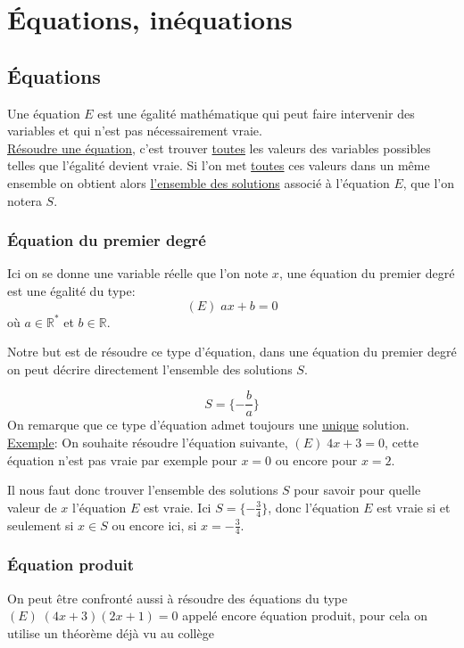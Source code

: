 \documentclass[french]{book}
\begin{document}
\section{Équations, inéquations}
\subsection{Équations}
\begin{defn}
Une équation $E$ est une égalité mathématique qui peut faire intervenir des variables et qui n'est pas nécessairement vraie. \\

\underline{Résoudre une équation}, c'est trouver \underline{toutes} les valeurs des variables possibles telles que l'égalité devient vraie. Si l'on met \underline{toutes} ces valeurs dans un même ensemble on obtient alors \underline{l'ensemble des solutions} associé à l'équation $E$, que l'on notera $S$. 
\end{defn}

\subsubsection{Équation du premier degré}
Ici on se donne une variable réelle que l'on note $x$, une équation du premier degré est une égalité du type: 
$$(E) \; ax+b=0 $$ 
où $a\in \mathbb{R}^{*}$ et $b\in \mathbb{R}$.

Notre but est de résoudre ce type d'équation, dans une équation du premier degré on peut décrire directement l'ensemble des solutions $S$.

$$S=\{ - \frac{b}{a}\}$$
On remarque que ce type d'équation admet toujours une \underline{unique} solution.\\


\underline{Exemple}: On souhaite résoudre l'équation suivante, $(E) \; 4x+3=0$, cette équation n'est pas vraie par exemple pour $x=0$ ou encore pour $x=2$.

Il nous faut donc trouver l'ensemble des solutions $S$ pour savoir pour quelle valeur de $x$ l'équation $E$ est vraie. Ici $S=\{-\frac{3}{4}\}$, donc l'équation $E$ est vraie si et seulement si $x\in S$ ou encore ici, si $x=-\frac{3}{4}$.

\subsubsection{Équation produit}
On peut être confronté aussi à résoudre des équations du type $(E) \; (4x+3)(2x+1)=0$ appelé encore équation produit, pour cela on utilise un théorème déjà vu au collège
\end{document}

